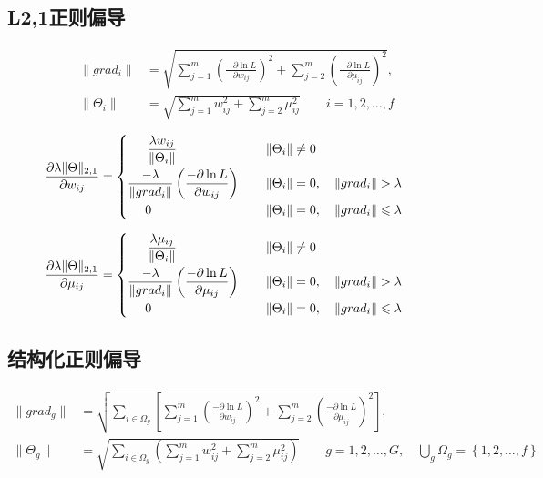 \documentclass[UTF8,10pt, twoside]{article}
\begin{document}
	
\subsection{L2,1正则偏导} 
\begin{equation} 
\begin{aligned} 
			\|grad_i\| &= \sqrt{ 
				\sum\limits_{j=1}^{m} \left(\frac{-\partial \ln L}{\partial w_{ij}}\right)^2 +  \sum\limits_{j=2}^{m} \left(\frac{-\partial \ln L}{\partial \mu_{ij}}\right)^2 }, 
			\\
			\|\Theta_i\| &= \sqrt{ \sum\limits_{j=1}^{m} w_{ij}^2 +  \sum\limits_{j=2}^{m} \mu_{ij}^2 }
			\qquad i=1,2,\ldots,f
\end{aligned} 
\end{equation}


\begin{equation} 
\frac{\partial \lambda\|\Theta\|_{2,1}}{\partial w_{ij}} = 
\begin{cases}
\begin{aligned} 
				\frac{\lambda w_{ij}}{\|\Theta_i\|} \qquad\qquad\qquad\quad   \|\Theta_i\| &\ne 0  \cr 
				\frac{-\lambda}{\|grad_i\|}\left(\frac{-\partial \ln L}{\partial w_{ij}}\right) \qquad  \|\Theta_i\| &= 0,\quad\|grad_i\|>\lambda\cr  
				0 \qquad\qquad\qquad\qquad\quad  \|\Theta_i\| &= 0,\quad\|grad_i\|\leqslant\lambda\cr 
\end{aligned}
\end{cases}
\end{equation}
			
			
\begin{equation} 
\frac{\partial \lambda\|\Theta\|_{2,1}}{\partial \mu_{ij}} = 
\begin{cases}
\begin{aligned} 
					\frac{\lambda \mu_{ij}}{\|\Theta_i\|} \qquad\qquad\qquad\quad   \|\Theta_i\| &\ne 0  \cr 
					\frac{-\lambda}{\|grad_i\|}\left(\frac{-\partial \ln L}{\partial \mu_{ij}}\right) \qquad  \|\Theta_i\| &= 0,\quad\|grad_i\|>\lambda\cr  
					0 \qquad\qquad\qquad\qquad\quad  \|\Theta_i\| &= 0,\quad\|grad_i\|\leqslant\lambda\cr 
\end{aligned}
\end{cases}
\end{equation}
				
				
\subsection{结构化正则偏导}
\begin{equation} 
\begin{aligned} 
					\|grad_g\| &= \sqrt{ \sum_{i\in\Omega_g}\left[
						\sum\limits_{j=1}^{m} \left(\frac{-\partial \ln L}{\partial w_{ij}}\right)^2 +  \sum\limits_{j=2}^{m} \left(\frac{-\partial \ln L}{\partial \mu_{ij}}\right)^2  \right]}, 
					\\
					\|\Theta_g\| &= \sqrt{\sum_{i\in\Omega_g}\left( \sum\limits_{j=1}^{m} w_{ij}^2 +  \sum\limits_{j=2}^{m} \mu_{ij}^2 \right)}
					\qquad g=1,2,\ldots,G, \quad  \bigcup\limits_g \Omega_g = \left\{1,2,\ldots,f\right\}  
\end{aligned} 
\end{equation}
				
\end{document}
